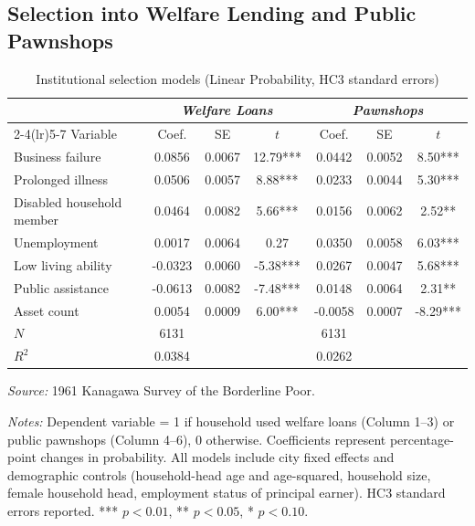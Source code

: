 \documentclass[12pt]{article}
\begin{document}
\subsection{Selection into Welfare Lending and Public Pawnshops}

\begin{table}[htbp]
\centering
\caption{Institutional selection models (Linear Probability, HC3 standard errors)}
\label{tab:selection}
\begin{threeparttable}
\begin{tabular}{@{\extracolsep{6pt}}lcccccc@{}}
\toprule
 & \multicolumn{3}{c}{\textit{Welfare Loans}} & \multicolumn{3}{c}{\textit{Pawnshops}} \\
\cmidrule(lr){2-4}\cmidrule(lr){5-7}
Variable & Coef. & SE & $t$ & Coef. & SE & $t$ \\
\midrule
Business failure & 0.0856 & 0.0067 & 12.79*** & 0.0442 & 0.0052 & 8.50*** \\
Prolonged illness & 0.0506 & 0.0057 & 8.88*** & 0.0233 & 0.0044 & 5.30*** \\
Disabled household member & 0.0464 & 0.0082 & 5.66*** & 0.0156 & 0.0062 & 2.52** \\
Unemployment & 0.0017 & 0.0064 & 0.27 & 0.0350 & 0.0058 & 6.03*** \\
Low living ability & -0.0323 & 0.0060 & -5.38*** & 0.0267 & 0.0047 & 5.68*** \\
Public assistance & -0.0613 & 0.0082 & -7.48*** & 0.0148 & 0.0064 & 2.31** \\
Asset count & 0.0054 & 0.0009 & 6.00*** & -0.0058 & 0.0007 & -8.29*** \\
\midrule
$N$ & 6131 &  &  & 6131 &  &  \\
$R^2$ & 0.0384 &  &  & 0.0262 &  &  \\
\bottomrule
\end{tabular}
\begin{tablenotes}
\small
\item \textit{Source:} 1961 Kanagawa Survey of the Borderline Poor.
\item \textit{Notes:} Dependent variable = 1 if household used welfare loans (Column 1--3) or public pawnshops (Column 4--6), 0 otherwise. Coefficients represent percentage-point changes in probability. All models include city fixed effects and demographic controls (household-head age and age-squared, household size, female household head, employment status of principal earner). HC3 standard errors reported. *** $p<0.01$, ** $p<0.05$, * $p<0.10$.
\end{tablenotes}
\end{threeparttable}
\end{table}
\end{document}
